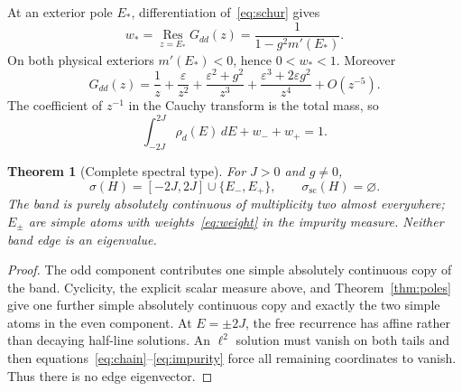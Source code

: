 \documentclass[9pt]{extarticle}
\newtheorem{theorem}{Theorem}
\newcommand{\scs}{\mathrm{sc}}
\begin{document}
At an exterior pole $E_*$, differentiation of~\eqref{eq:schur} gives
\begin{equation}\label{eq:weight}
 w_* = \underset{z=E_*}{\operatorname{Res}}G_{dd}(z)
 =\frac1{1-g^2m'(E_*)}.
\end{equation}
On both physical exteriors $m'(E_*)<0$, hence $0<w_*<1$.  Moreover
\begin{equation}\label{eq:moments}
 G_{dd}(z)=\frac1z+\frac{\varepsilon}{z^2}
 +\frac{\varepsilon^2+g^2}{z^3}
 +\frac{\varepsilon^3+2\varepsilon g^2}{z^4}+O(z^{-5}).
\end{equation}
The coefficient of $z^{-1}$ in the Cauchy transform is the total mass, so
\begin{equation}\label{eq:mass}
 \int_{-2J}^{2J}\rho_d(E)\,dE+w_-+w_+=1.
\end{equation}

\begin{theorem}[Complete spectral type]\label{thm:spectrum}
For $J>0$ and $g\ne0$,
\[
 \sigma(H)=[-2J,2J]\cup\{E_-,E_+\},\qquad
 \sigma_{\scs}(H)=\varnothing.
\]
The band is purely absolutely continuous of multiplicity two almost
everywhere; $E_\pm$ are simple atoms with weights~\eqref{eq:weight} in the
impurity measure.  Neither band edge is an eigenvalue.
\end{theorem}

\begin{proof}
The odd component contributes one simple absolutely continuous copy of the
band.  Cyclicity, the explicit scalar measure above, and
Theorem~\ref{thm:poles} give one further simple absolutely continuous copy
and exactly the two simple atoms in the even component.  At $E=\pm2J$, the
free recurrence has affine rather than decaying half-line solutions.  An
$\ell^2$ solution must vanish on both tails and then
equations~\eqref{eq:chain}--\eqref{eq:impurity} force all remaining
coordinates to vanish.  Thus there is no edge eigenvector.
\end{proof}
\end{document}
